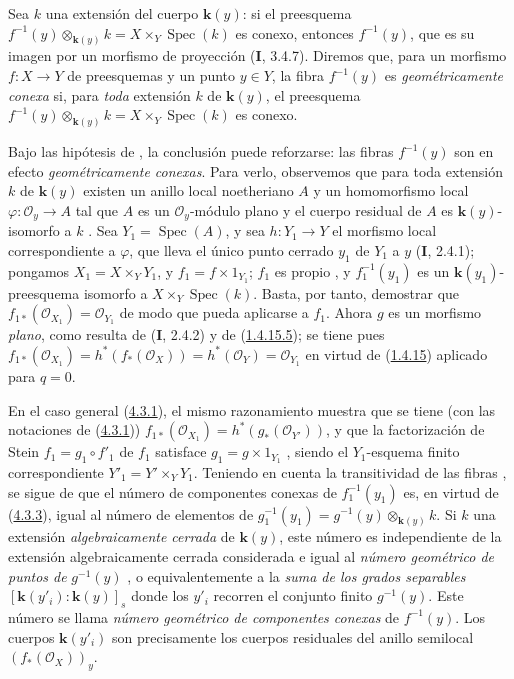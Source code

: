 \begin{remark}[4.3.4]
\label{III.4.3.4}
\label{III.4.3.4-fr}
Sea $k$ una extensión del cuerpo $\boldsymbol{k}(y)$: si el preesquema $f^{-1}(y)\otimes_{\boldsymbol{k}(y)}k=X\times_Y\operatorname{Spec}(k)$
es conexo, entonces $f^{-1}(y)$, que es su imagen por un morfismo de proyección (\textbf{I}, 3.4.7). Diremos que, para un morfismo $f:X\to Y$ de preesquemas y un punto
$y\in Y$, la fibra $f^{-1}(y)$ es
\emph{geométricamente conexa} si, para \emph{toda} extensión $k$ de
$\boldsymbol{k}(y)$, el preesquema
$f^{-1}(y)\otimes_{\boldsymbol{k}(y)}k=X\times_Y\operatorname{Spec}(k)$ es conexo.


Bajo las hipótesis de , la conclusión puede
reforzarse: las fibras $f^{-1}(y)$ son en efecto \emph{geométricamente conexas}. Para verlo, observemos que para toda extensión $k$ de $\boldsymbol{k}(y)$ existen un anillo
local noetheriano $A$ y un homomorfismo local
$\varphi:\mathcal O_y\to A$
tal que $A$ es un $\mathcal O_y$-módulo plano y el cuerpo residual de
$A$ es $\boldsymbol{k}(y)$-isomorfo a $k$ .
Sea $Y_1=\operatorname{Spec}(A)$, y sea $h:Y_1\to Y$ el morfismo local
correspondiente a $\varphi$, que lleva el único punto cerrado $y_1$ de
$Y_1$ a $y$ (\textbf{I}, 2.4.1); pongamos
$X_1=X\times_YY_1$, y $f_1=f\times1_{Y_1}$; $f_1$ es propio
, y $f_1^{-1}(y_1)$ es un
$\boldsymbol{k}(y_1)$-preesquema isomorfo a $X\times_Y\operatorname{Spec}(k)$. Basta, por
tanto, demostrar que
$f_{1*}(\mathcal O_{X_1})=\mathcal O_{Y_1}$
de modo que  pueda aplicarse a $f_1$. Ahora $g$ es un morfismo \emph{plano},
como resulta de (\textbf{I}, 2.4.2) y de
(\hyperref[III.1.4.15-fr]{1.4.15.5}); se tiene pues
$f_{1*}(\mathcal O_{X_1})
=h^*(f_*(\mathcal O_X))
=h^*(\mathcal O_Y)
=\mathcal O_{Y_1}$
en virtud de (\hyperref[III.1.4.15-fr]{1.4.15}) aplicado para $q=0$.

En el caso general (\hyperref[III.4.3.1-fr]{4.3.1}), el mismo razonamiento
muestra que se tiene (con las notaciones de
(\hyperref[III.4.3.1-fr]{4.3.1}))
$f_{1*}(\mathcal O_{X_1})=h^*(g_*(\mathcal O_{Y'}))$,
y que la factorización de Stein $f_1=g_1\circ f'_1$ de $f_1$
satisface
$g_1=g\times1_{Y_1}$
, siendo el $Y_1$-esquema finito correspondiente
$Y'_1=Y'\times_YY_1$. Teniendo en cuenta la transitividad de las
fibras , se sigue de
 que el número de componentes conexas de
$f_1^{-1}(y_1)$ es, en virtud de (\hyperref[III.4.3.3-fr]{4.3.3}), igual al número de elementos de $g_1^{-1}(y_1)=g^{-1}(y)\otimes_{\boldsymbol{k}(y)}k$.
Si $k$ una extensión \emph{algebraicamente cerrada} de $\boldsymbol{k}(y)$, este número
es independiente de la extensión algebraicamente cerrada considerada e igual al
\emph{número geométrico de puntos de} $g^{-1}(y)$
, o equivalentemente a la \emph{suma de los grados separables}
$[\boldsymbol{k}(y'_i):\boldsymbol{k}(y)]_s$
donde los $y'_i$ recorren el conjunto finito $g^{-1}(y)$. Este número
se llama \emph{número geométrico de componentes conexas} de
$f^{-1}(y)$. Los cuerpos $\boldsymbol{k}(y'_i)$ son precisamente los cuerpos
residuales del anillo semilocal $(f_*(\mathcal O_X))_y$.
\end{remark}

